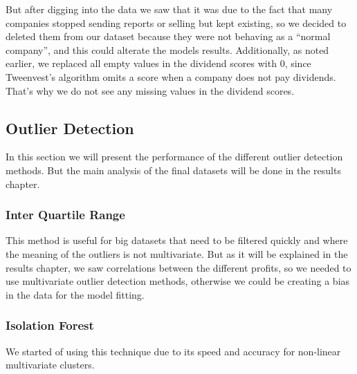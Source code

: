 \documentclass[11pt,english,a4paper,hidelinks]{book}
\begin{document}
\noindent But after digging into the data we saw that it was due to the fact that many companies stopped sending reports or selling but kept existing, so we decided to deleted them from our dataset because they were not behaving as a ``normal company'', and this could alterate the models results. Additionally, as noted earlier, we replaced all empty values in the dividend scores with 0, since Tweenvest's algorithm omits a score when a company does not pay dividends. That's why we do not see any missing values in the dividend scores.

\subsection{Outlier Detection}

In this section we will present the performance of the different outlier detection methods. But the main analysis of the final datasets will be done in the results chapter.

\subsubsection{Inter Quartile Range}

This method is useful for big datasets that need to be filtered quickly and where the meaning of the outliers is not multivariate. But as it will be explained in the results chapter, we saw correlations between the different profits, so we needed to use multivariate outlier detection methods, otherwise we could be creating a bias in the data for the model fitting.

\subsubsection{Isolation Forest}

We started of using this technique due to its speed and accuracy for non-linear multivariate clusters.
\end{document}
